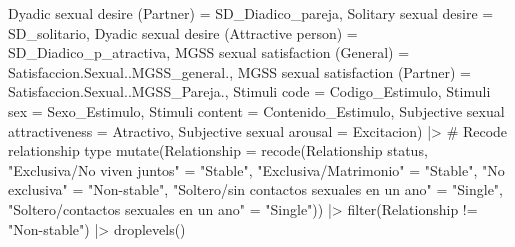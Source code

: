 \documentclass[
  bookmarksnumbered]{article}
\newenvironment{Shaded}{\begin{snugshade}}{\end{snugshade}}
\newcommand{\AttributeTok}[1]{\textcolor[rgb]{0.80,0.80,0.80}{#1}}
\newcommand{\CommentTok}[1]{\textcolor[rgb]{0.50,0.62,0.50}{#1}}
\newcommand{\FunctionTok}[1]{\textcolor[rgb]{0.94,0.94,0.56}{#1}}
\newcommand{\NormalTok}[1]{\textcolor[rgb]{0.80,0.80,0.80}{#1}}
\newcommand{\OtherTok}[1]{\textcolor[rgb]{0.94,0.94,0.56}{#1}}
\newcommand{\SpecialCharTok}[1]{\textcolor[rgb]{0.86,0.64,0.64}{#1}}
\newcommand{\StringTok}[1]{\textcolor[rgb]{0.80,0.58,0.58}{#1}}
\begin{document}
\begin{Shaded}
\begin{Highlighting}[]
         \StringTok{\textasciigrave{}}\AttributeTok{Dyadic sexual desire (Partner)}\StringTok{\textasciigrave{}} \OtherTok{=}\NormalTok{ SD\_Diadico\_pareja,}
         \StringTok{\textasciigrave{}}\AttributeTok{Solitary sexual desire}\StringTok{\textasciigrave{}} \OtherTok{=}\NormalTok{ SD\_solitario,}
         \StringTok{\textasciigrave{}}\AttributeTok{Dyadic sexual desire (Attractive person)}\StringTok{\textasciigrave{}} \OtherTok{=}\NormalTok{ SD\_Diadico\_p\_atractiva,}
         \StringTok{\textasciigrave{}}\AttributeTok{MGSS sexual satisfaction (General)}\StringTok{\textasciigrave{}} \OtherTok{=}\NormalTok{ Satisfaccion.Sexual..MGSS\_general.,}
         \StringTok{\textasciigrave{}}\AttributeTok{MGSS sexual satisfaction (Partner)}\StringTok{\textasciigrave{}} \OtherTok{=}\NormalTok{ Satisfaccion.Sexual..MGSS\_Pareja.,}
         \StringTok{\textasciigrave{}}\AttributeTok{Stimuli code}\StringTok{\textasciigrave{}} \OtherTok{=}\NormalTok{ Codigo\_Estimulo,}
         \StringTok{\textasciigrave{}}\AttributeTok{Stimuli sex}\StringTok{\textasciigrave{}} \OtherTok{=}\NormalTok{ Sexo\_Estimulo,}
         \StringTok{\textasciigrave{}}\AttributeTok{Stimuli content}\StringTok{\textasciigrave{}} \OtherTok{=}\NormalTok{ Contenido\_Estimulo,}
         \StringTok{\textasciigrave{}}\AttributeTok{Subjective sexual attractiveness}\StringTok{\textasciigrave{}} \OtherTok{=}\NormalTok{ Atractivo,}
         \StringTok{\textasciigrave{}}\AttributeTok{Subjective sexual arousal}\StringTok{\textasciigrave{}} \OtherTok{=}\NormalTok{ Excitacion) }\SpecialCharTok{|\textgreater{}}
  \CommentTok{\# Recode relationship type}
  \FunctionTok{mutate}\NormalTok{(}\AttributeTok{Relationship =} \FunctionTok{recode}\NormalTok{(}\StringTok{\textasciigrave{}}\AttributeTok{Relationship status}\StringTok{\textasciigrave{}}\NormalTok{,}
                               \StringTok{"Exclusiva/No viven juntos"} \OtherTok{=} \StringTok{"Stable"}\NormalTok{,}
                               \StringTok{"Exclusiva/Matrimonio"} \OtherTok{=} \StringTok{"Stable"}\NormalTok{,}
                               \StringTok{"No exclusiva"} \OtherTok{=} \StringTok{"Non{-}stable"}\NormalTok{,}
                               \StringTok{"Soltero/sin contactos sexuales en un ano"} \OtherTok{=} \StringTok{"Single"}\NormalTok{,}
                               \StringTok{"Soltero/contactos sexuales en un ano"} \OtherTok{=} \StringTok{"Single"}\NormalTok{)) }\SpecialCharTok{|\textgreater{}} 
  \FunctionTok{filter}\NormalTok{(Relationship }\SpecialCharTok{!=} \StringTok{"Non{-}stable"}\NormalTok{) }\SpecialCharTok{|\textgreater{}} 
  \FunctionTok{droplevels}\NormalTok{()}
\end{Highlighting}
\end{Shaded}
\end{document}
